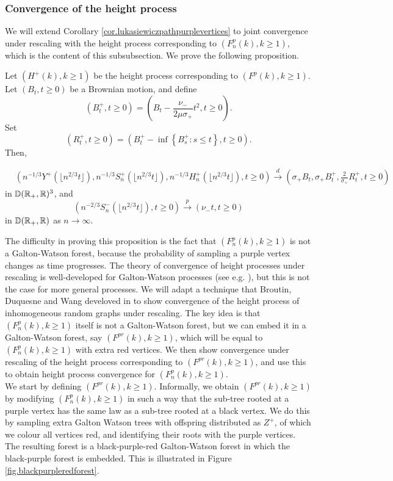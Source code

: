 \subsubsection{Convergence of the height process}\label{subsubsec.convheightprocess}
We will extend Corollary \ref{cor.lukasiewiczpathpurplevertices} to joint convergence under rescaling with the height process corresponding to $(F^p_n(k),k\geq 1)$, which is the content of this subsubsection. We prove the following proposition. 
\begin{proposition}\label{prop.convheightprocesspurple}
Let $(H^{+}(k),k\geq 1)$ be the height process corresponding to $(F^p(k),k\geq 1)$. Let $(B_t,t\geq 0)$ be a Brownian motion, and define 
$$({B}^+_t,t\geq 0)=\left(B_t-\frac{\nu_-}{2\mu\sigma_+}t^2,t\geq 0\right).$$ 
Set $$(R^+_t,t\geq 0)=\left({B}^+_t-\inf\left\{{B}^+_s: s\leq t\right\},t\geq 0 \right).$$
Then,

\begin{align*}&\left(n^{-1/3}Y^{+}\left(\lfloor n^{2/3}t\rfloor\right), n^{-1/3}S^{+}_n\left(\lfloor n^{2/3}t\rfloor\right),n^{-1/3}H^{+}_n\left(\lfloor n^{2/3}t\rfloor\right), t\geq 0\right) \overset{d}{\to}\left(\sigma_+B_t,\sigma_+{B}^+_t, \frac{2}{\sigma_+} R^+_t,  t\geq 0\right)\end{align*}
 in ${\mathbb D}({\mathbb R}_+,{\mathbb R})^3$, and 
 $$\left(n^{-2/3}S^{-}_n\left(\lfloor n^{2/3}t\rfloor\right),t\geq 0\right)\overset{p}{\to}\left(\nu_- t,t\geq 0\right)$$
 in ${\mathbb D}({\mathbb R}_+,{\mathbb R})$ as $n\to\infty$.
\end{proposition}
The difficulty in proving this proposition is the fact that $(F^p_n(k),k\geq 1)$ is not a Galton-Watson forest, because the probability of sampling a purple vertex changes as time progresses. The theory of convergence of height processes under rescaling is well-developed for Galton-Watson processes (see e.g. \cite{Duquesne2005}), but this is not the case for more general processes.  We will adapt a technique that Broutin, Duquesne and Wang develoved in \cite{Broutin2020} to show convergence of the height process of inhomogeneous random graphs under rescaling. The key idea is that  $(F^p_n(k),k\geq 1)$ itself is not a Galton-Watson forest, but we can embed it in a Galton-Watson forest, say $(F^{pr}(k),k\geq 1)$, which will be equal to $(F^p_n(k),k\geq 1)$ with extra red vertices. We then show convergence under rescaling of the height process corresponding to $(F^{pr}(k),k\geq 1)$, and use this to obtain height process convergence for $(F^p_n(k),k\geq 1)$. \\
We start by defining $(F^{pr}(k),k\geq 1)$. Informally, we obtain $(F^{pr}(k),k\geq 1)$ by modifying $(F^p_n(k),k\geq 1)$ in such a way that the sub-tree rooted at a purple vertex has the same law as a sub-tree rooted at a black vertex. We do this by sampling extra Galton Watson trees with offspring distributed as $Z^+$, of which we colour all vertices red, and identifying their roots with the purple vertices. The resulting forest is a black-purple-red Galton-Watson forest in which the black-purple forest is embedded. This is illustrated in Figure \ref{fig.blackpurpleredforest}. 

